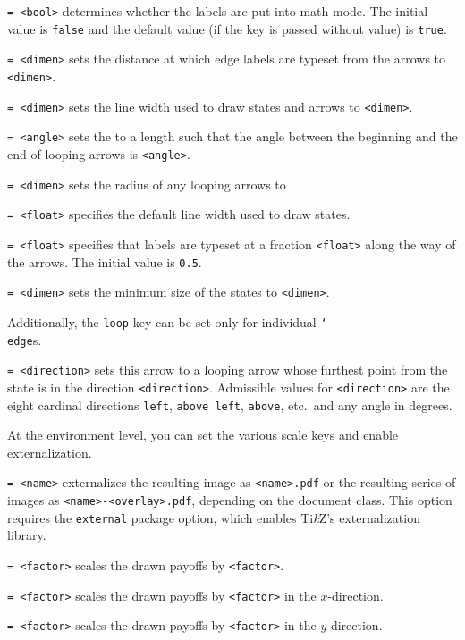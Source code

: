 \documentclass{article}
\newenvironment{desc}{\itemize[leftmargin=50pt]}{\enditemize}
\def\option#1#2{\item[\texttt{#1}] \hskip-1.5pt\texttt{#2}}
\renewcommand{\textbackslash}{\char`\\}
\def\cmd#1{\texttt{\color{cmd}\textbackslash#1}}
\def\TikZ{Ti\emph{k}Z\xspace}
\begin{document}
\begin{desc}
\option{force math}{= <bool>} determines whether the labels are put into math mode. The initial value is \texttt{false} and the default value (if the key is passed without value) is \texttt{true}. %

\option{label sep}{= <dimen>} sets the distance at which edge labels are typeset from the arrows to \texttt{<dimen>}.

\option{line width}{= <dimen>} sets the line width used to draw states and arrows to \texttt{<dimen>}.

\option{loop angle}{= <angle>} sets the  to a length such that the angle between the beginning and the end of looping arrows is \texttt{<angle>}.

\option{loop radius}{= <dimen>} sets the radius of any looping arrows to . 

\option{path}{= <float>} specifies the default line width used to draw states.

\option{pos}{= <float>} specifies that labels are typeset at a fraction \texttt{<float>} along the way of the arrows. The initial value is \texttt{0.5}.

\option{radius}{= <dimen>} sets the minimum size of the states to \texttt{<dimen>}.
\end{desc}

\noindent Additionally, the \texttt{loop} key can be set only for individual \cmd{edge}s.

\begin{desc}
\option{loop}{= <direction>} sets this arrow to a looping arrow whose furthest point from the state is in the direction \texttt{<direction>}. Admissible values for \texttt{<direction>} are the eight cardinal directions \texttt{left}, \texttt{above left}, \texttt{above}, etc.\ and any angle in degrees.
\end{desc}

\noindent At the environment level, you can set the various scale keys and enable externalization.

\begin{desc}
\option{external}{= <name>} externalizes the resulting image as \texttt{<name>.pdf} or the resulting series of images as \texttt{<name>-<overlay>.pdf}, depending on the document class. This option requires the \texttt{external} package option, which enables \TikZ's externalization library.

\option{scale}{= <factor>} scales the drawn payoffs by \texttt{<factor>}.

\option{xscale}{= <factor>} scales the drawn payoffs by \texttt{<factor>} in the $x$-direction.

\option{yscale}{= <factor>} scales the drawn payoffs by \texttt{<factor>} in the $y$-direction.
\end{desc}
\end{document}
